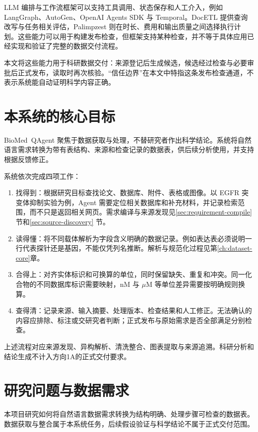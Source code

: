 LLM 编排与工作流框架可以支持工具调用、状态保存和人工介入，例如 LangGraph、AutoGen、OpenAI Agents SDK 与 Temporal\cite{langgraph,autogen,openai-agents,temporal-approval}。DocETL 提供查询改写与任务相关评估，Palimpzest 则在时长、费用和输出质量之间选择执行计划\cite{docetl,palimpzest}。这些能力可以用于构建发布检查，但框架支持某种检查，并不等于具体应用已经实现和验证了完整的数据交付流程。

本文将这些能力用于科研数据交付：来源登记后生成候选，候选经过检查与必要审批后正式发布，读取时再次核验。“信任边界”在本文中特指这条发布检查通道，不表示系统能自动证明科学内容正确。

\section{本系统的核心目标}

\mbox{BioMed QAgent} 聚焦于数据获取与处理，不替研究者作出科学结论。系统将自然语言需求转换为带有表结构、来源和检查记录的数据表，供后续分析使用，并支持根据反馈修正。

系统依次完成四项工作：

\begin{enumerate}
  \item 找得到：根据研究目标查找论文、数据库、附件、表格或图像。以 EGFR 突变体抑制实验为例，Agent 需要定位相关数据库和补充材料，并记录检索范围，而不只是返回相关网页。需求编译与来源发现见\ref{sec:requirement-compile} 节和\ref{sec:source-discovery} 节。
  \item 读得懂：将不同载体解析为字段含义明确的数据记录。例如表达表必须说明一行代表探针还是基因，不能仅凭列名推断。解析与规范化过程见第\ref{ch:dataset-core}章。
  \item 合得上：对齐实体标识和可换算的单位，同时保留缺失、重复和冲突。同一化合物的不同数据库标识需要映射，nM 与 $\mu$M 等单位差异需要按明确规则换算。
  \item 查得清：记录来源、输入摘要、处理版本、检查结果和人工修正。无法确认的内容应排除、标注或交研究者判断；正式发布与原始需求是否全部满足分别检查。
\end{enumerate}

上述流程对应来源发现、异构解析、清洗整合、图表提取与来源追溯。科研分析和结论生成不计入方向1A的正式交付要求。

\section{研究问题与数据需求}

本项目研究如何将自然语言数据需求转换为结构明确、处理步骤可检查的数据表。数据获取与整合属于本系统任务，后续假设验证与科学结论不属于正式交付范围。

